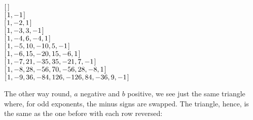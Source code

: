 \documentclass[tikz]{scrreprt}
\begin{document}
\begin{minipage}{\textwidth}
\ensuremath{[\mskip1.5mu \mskip1.5mu]}\\
\ensuremath{[\mskip1.5mu \mathrm{1},\mathbin{-}\mathrm{1}\mskip1.5mu]}\\
\ensuremath{[\mskip1.5mu \mathrm{1},\mathbin{-}\mathrm{2},\mathrm{1}\mskip1.5mu]}\\
\ensuremath{[\mskip1.5mu \mathrm{1},\mathbin{-}\mathrm{3},\mathrm{3},\mathbin{-}\mathrm{1}\mskip1.5mu]}\\
\ensuremath{[\mskip1.5mu \mathrm{1},\mathbin{-}\mathrm{4},\mathrm{6},\mathbin{-}\mathrm{4},\mathrm{1}\mskip1.5mu]}\\
\ensuremath{[\mskip1.5mu \mathrm{1},\mathbin{-}\mathrm{5},\mathrm{10},\mathbin{-}\mathrm{10},\mathrm{5},\mathbin{-}\mathrm{1}\mskip1.5mu]}\\
\ensuremath{[\mskip1.5mu \mathrm{1},\mathbin{-}\mathrm{6},\mathrm{15},\mathbin{-}\mathrm{20},\mathrm{15},\mathbin{-}\mathrm{6},\mathrm{1}\mskip1.5mu]}\\
\ensuremath{[\mskip1.5mu \mathrm{1},\mathbin{-}\mathrm{7},\mathrm{21},\mathbin{-}\mathrm{35},\mathrm{35},\mathbin{-}\mathrm{21},\mathrm{7},\mathbin{-}\mathrm{1}\mskip1.5mu]}\\
\ensuremath{[\mskip1.5mu \mathrm{1},\mathbin{-}\mathrm{8},\mathrm{28},\mathbin{-}\mathrm{56},\mathrm{70},\mathbin{-}\mathrm{56},\mathrm{28},\mathbin{-}\mathrm{8},\mathrm{1}\mskip1.5mu]}\\
\ensuremath{[\mskip1.5mu \mathrm{1},\mathbin{-}\mathrm{9},\mathrm{36},\mathbin{-}\mathrm{84},\mathrm{126},\mathbin{-}\mathrm{126},\mathrm{84},\mathbin{-}\mathrm{36},\mathrm{9},\mathbin{-}\mathrm{1}\mskip1.5mu]}
\end{minipage}

The other way round, $a$ negative and $b$ positive,
we see just the same triangle where, for odd exponents,
the minus signs are swapped.
The triangle, hence, is the same as the one before
with each row reversed:
\end{document}

